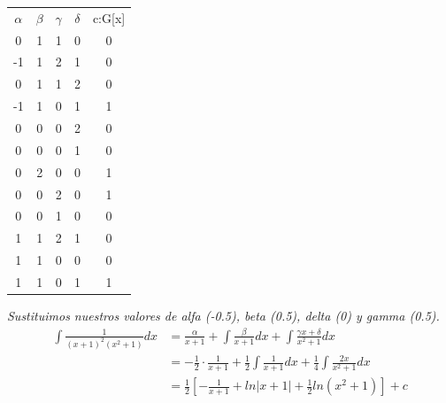 \documentclass{article}
\newcommand{\ints}{\displaystyle \int \!}
\begin{document}
\begin{table}[h]
\centering
\begin{tabular}{ccccc}
$\alpha$ & $\beta$ & $\gamma$ & $\delta$ & c:G{[}x{]} \\
0                     & 1                    & 1                     & 0                     & 0          \\
-1                    & 1                    & 2                     & 1                     & 0          \\
0                     & 1                    & 1                     & 2                     & 0          \\
-1                    & 1                    & 0                     & 1                     & 1          \\
0                     & 0                    & 0                     & 2                     & 0          \\
0                     & 0                    & 0                     & 1                     & 0          \\
0                     & 2                    & 0                     & 0                     & 1          \\
0                     & 0                    & 2                     & 0                     & 1          \\
0                     & 0                    & 1                     & 0                     & 0          \\
1                     & 1                    & 2                     & 1                     & 0          \\
1                     & 1                    & 0                     & 0                     & 0          \\
1                     & 1                    & 0                     & 1                     & 1         
\end{tabular}
\end{table} 
\textit{Sustituimos nuestros valores de alfa (-0.5), beta (0.5), delta (0) y gamma (0.5).}
\begin{align*}
    \ints \frac{1}{(x+1)^2(x^2+1)}dx &= \frac{\alpha}{x+1} + \ints \frac{\beta}{x+1}dx + \ints \frac{\gamma x + \delta}{x^2+1}dx \\
    &= -\frac{1}{2} \cdot \frac{1}{x+1} + \frac{1}{2} \ints \frac{1}{x+1}dx + \frac{1}{4} \ints \frac{2x}{x^2+1}dx \\
    &= \frac{1}{2} \left[ -\frac{1}{x+1} + ln|x+1| + \frac{1}{2}ln(x^2+1) \right] + c
\end{align*}
\end{document}
